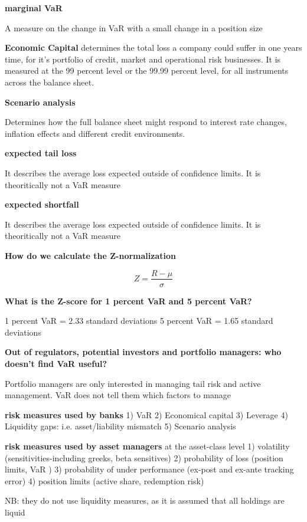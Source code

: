 \documentclass[12pt]{article}
\begin{document}
{\textbf{marginal VaR}

A measure on the change in VaR with a small change in a position size

\textbf{Economic Capital} determines the total loss a company could suffer in one years time, for it's portfolio of credit, market and operational risk businesses. It is measured at the 99 percent level or the 99.99 percent level, for all instruments across the balance sheet. 

\textbf{Scenario analysis}

Determines how the full balance sheet might respond to interest rate changes, inflation effects and different credit environments. 

\textbf{expected tail loss}

It describes the average loss expected outside of confidence limits. It is theoritically not a VaR measure

\textbf{expected shortfall}

It describes the average loss expected outside of confidence limits. It is theoritically not a VaR measure

\textbf{How do we calculate the Z-normalization}

$$
Z = \dfrac{R - \mu}{\sigma}
$$

\textbf{What is the Z-score for 1 percent VaR and 5 percent VaR?}

1 percent VaR = 2.33 standard deviations
5 percent VaR = 1.65 standard deviations

\textbf{Out of regulators, potential investors and portfolio managers: who doesn't find VaR useful?}

Portfolio managers are only interested in managing tail risk and active management. VaR does not tell them which factors to manage

\begin{framed}
	
	\textbf{risk measures used by banks}
	1) VaR
	2) Economical capital
	3) Leverage 
	4) Liquidity gaps: i.e. asset/liability mismatch
	5) Scenario analysis
	
		\textbf{risk measures used by asset managers}
		at the asset-class level
	1) volatility (sensitivities-including greeks, beta sensitives)
	2) probability of loss (position limits, VaR )
	3) probability of under performance (ex-post and ex-ante tracking error)
	4) position limits (active share, redemption risk)
	
	NB: they do not use liquidity measures, as it is assumed that all holdings are liquid
	

\end{framed}}
\end{document}
